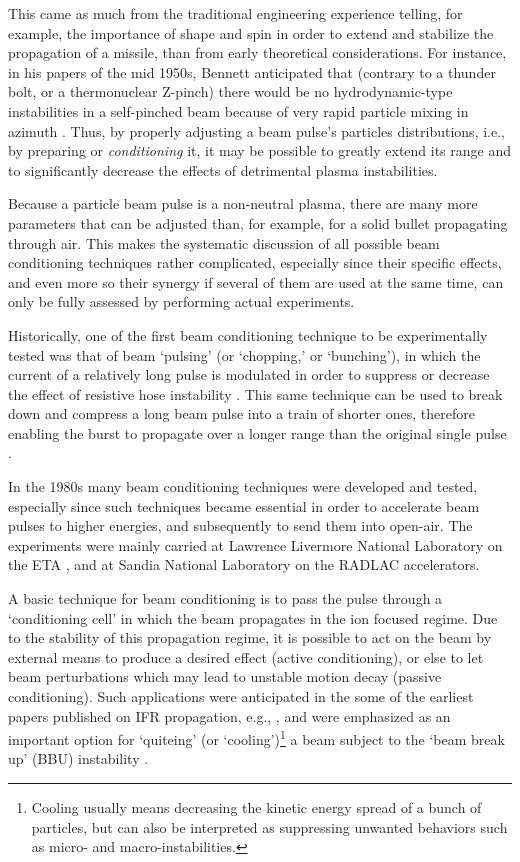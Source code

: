 \documentclass [12pt,a4paper,     ]{report} %
\begin{document}
   This came as much from the traditional engineering experience telling, for example, the importance of shape and spin in order to extend and stabilize the propagation of a missile, than from early theoretical considerations.  For instance, in his papers of the mid 1950s,  Bennett anticipated that (contrary to a thunder bolt, or a thermonuclear Z-pinch) there would be no hydrodynamic-type instabilities in a self-pinched beam because of very rapid particle mixing in azimuth \cite{BENNE1955-}.  Thus, by properly adjusting a beam pulse's particles distributions, i.e.,  by preparing or \emph{conditioning} it, it may be possible to greatly extend its range and to significantly decrease the effects of detrimental plasma instabilities.


   Because a particle beam pulse is a non-neutral plasma, there are many more parameters that can be adjusted than, for example, for a solid bullet propagating through air.  This makes the systematic discussion of all possible beam conditioning techniques rather complicated, especially since their specific effects, and even more so their synergy if several of them are used at the same time, can only be fully assessed by performing actual experiments.

   Historically, one of the first beam conditioning technique to be experimentally tested was that of beam `pulsing' (or `chopping,' or `bunching'), in which the current of a relatively long pulse is modulated in order to suppress or decrease the effect of resistive hose instability \cite{BEAL-1972-}.  This same technique can be used to break down and compress a long beam pulse into a train of shorter ones, therefore enabling the burst to propagate over a longer range than the original single pulse \cite{NEIL-1980-}.

   In the 1980s many beam conditioning techniques were developed and tested, especially since such techniques became essential in order to accelerate beam pulses to higher energies, and subsequently to send them into open-air.  The experiments were mainly carried at Lawrence Livermore National Laboratory on the ETA \cite{CLARK1984}, and at Sandia National Laboratory on the RADLAC \cite{EKDAH1986-} accelerators.


   A basic technique for beam conditioning is to pass the pulse through a `conditioning cell' in which the beam propagates in the ion focused regime.  Due to the stability of this propagation regime, it is possible to act on the beam by external means to produce a desired effect (active conditioning), or else to let beam perturbations which may lead to unstable motion decay (passive conditioning).  Such applications were anticipated in the some of the earliest papers published on IFR propagation, e.g., \cite{DIDEN1976A}, and were emphasized as an important option for `quiteing' (or `cooling')\footnote{Cooling usually means decreasing the kinetic energy spread of a bunch of particles, but can also be interpreted as suppressing unwanted behaviors such as micro- and macro-instabilities.} a beam subject to the `beam break up' (BBU) instability \cite{BRIGG1981-}.
\end{document}
